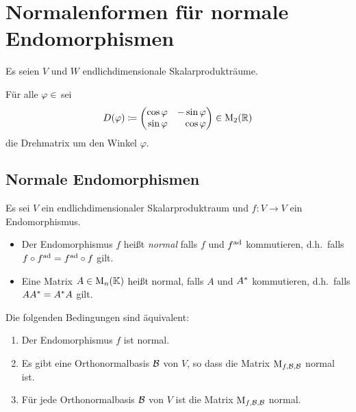 \chapter{Normalenformen für normale Endomorphismen}

Es seien $V$ und $W$ endlichdimensionale Skalarprodukträume.

Für alle $\varphi \in \real$ sei
\[
            D(\varphi)
  \coloneqq \begin{pmatrix*}[r]
              \cos \varphi  & -\sin \varphi \\
              \sin \varphi  &  \cos \varphi
            \end{pmatrix*}
  \in       \matrices{2}{\Real}
\]
die Drehmatrix um den Winkel $\varphi$.





\section{Normale Endomorphismen}

Es sei $V$ ein endlichdimensionaler Skalarproduktraum und $f \colon V \to V$ ein Endomorphismus.

\begin{definition}
  \leavevmode
  \begin{itemize}
    \item
      Der Endomorphismus $f$ heißt \emph{normal} falls $f$ und $f^{\operatorname{ad}}$ kommutieren, d.h.\ falls $f \circ f^{\operatorname{ad}} = f^{\operatorname{ad}} \circ f$ gilt.
    \item
      Eine Matrix $A \in \operatorname{M}_{n}(\mathbb{K})$ heißt normal, falls $A$ und $A^*$ kommutieren, d.h.\ falls $A A^* = A^* A$ gilt.
  \end{itemize}
\end{definition}

\begin{lemma}
  Die folgenden Bedingungen sind äquivalent:
  \begin{enumerate}
    \item
      Der Endomorphismus $f$ ist normal.
    \item
      Es gibt eine Orthonormalbasis $\mathcal{B}$ von $V$, so dass die Matrix $\operatorname{M}_{f, \mathcal{B}, \mathcal{B}}$ normal ist.
    \item
      Für jede Orthonormalbasis $\mathcal{B}$ von $V$ ist die Matrix $\operatorname{M}_{f, \mathcal{B}, \mathcal{B}}$ normal.
  \end{enumerate}
\end{lemma}



